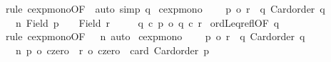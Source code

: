 \begin{isabellebody}
\ {\isacharparenleft}{\kern0pt}rule\ cexp{\isacharunderscore}{\kern0pt}mono{\isacharbrackleft}{\kern0pt}OF\ {}{\isacharbrackright}{\kern0pt}{\isacharparenright}{\kern0pt}\ {\isacharparenleft}{\kern0pt}auto\ simp{\isacharcolon}{\kern0pt}\ q{\isacharparenright}{\kern0pt}%
\endisatagproof
{\isafoldproof}%
%
\isadelimproof
\isanewline
%
\endisadelimproof
\isanewline
{}\isamarkupfalse%
\ cexp{\isacharunderscore}{\kern0pt}mono{}{\isacharprime}{\kern0pt}{\isacharcolon}{\kern0pt}\isanewline
\ \ \ {}{\isacharcolon}{\kern0pt}\ {\isachardoublequoteopen}p{}\ {\isasymle}o\ r{}{\isachardoublequoteclose}\ \ q{\isacharcolon}{\kern0pt}\ {\isachardoublequoteopen}Card{\isacharunderscore}{\kern0pt}order\ q{\isachardoublequoteclose}\isanewline
\ \ \ n{\isacharcolon}{\kern0pt}\ {\isachardoublequoteopen}Field\ p{}\ {\isacharequal}{\kern0pt}\ {\isacharbraceleft}{\kern0pt}{\isacharbraceright}{\kern0pt}\ {\isasymLongrightarrow}\ Field\ r{}\ {\isacharequal}{\kern0pt}\ {\isacharbraceleft}{\kern0pt}{\isacharbraceright}{\kern0pt}{\isachardoublequoteclose}\isanewline
\ \ \ {\isachardoublequoteopen}q\ {\isacharcircum}{\kern0pt}c\ p{}\ {\isasymle}o\ q\ {\isacharcircum}{\kern0pt}c\ r{}{\isachardoublequoteclose}\isanewline
%
\isadelimproof
%
\endisadelimproof
%
\isatagproof
{}\isamarkupfalse%
\ ordLeq{\isacharunderscore}{\kern0pt}refl{\isacharbrackleft}{\kern0pt}OF\ q{\isacharbrackright}{\kern0pt}\ \isamarkupfalse%
\ {\isacharparenleft}{\kern0pt}rule\ cexp{\isacharunderscore}{\kern0pt}mono{\isacharprime}{\kern0pt}{\isacharbrackleft}{\kern0pt}OF\ {\isacharunderscore}{\kern0pt}\ {}\ n{\isacharbrackright}{\kern0pt}{\isacharparenright}{\kern0pt}\ auto%
\endisatagproof
{\isafoldproof}%
%
\isadelimproof
\isanewline
%
\endisadelimproof
\isanewline
{}\isamarkupfalse%
\ cexp{\isacharunderscore}{\kern0pt}mono{}{\isacharcolon}{\kern0pt}\isanewline
\ \ \ {}{\isacharcolon}{\kern0pt}\ {\isachardoublequoteopen}p{}\ {\isasymle}o\ r{}{\isachardoublequoteclose}\ \ q{\isacharcolon}{\kern0pt}\ {\isachardoublequoteopen}Card{\isacharunderscore}{\kern0pt}order\ q{\isachardoublequoteclose}\isanewline
\ \ \ n{\isacharcolon}{\kern0pt}\ {\isachardoublequoteopen}p{}\ {\isacharequal}{\kern0pt}o\ czero\ {\isasymLongrightarrow}\ r{}\ {\isacharequal}{\kern0pt}o\ czero{\isachardoublequoteclose}\ \ card{\isacharcolon}{\kern0pt}\ {\isachardoublequoteopen}Card{\isacharunderscore}{\kern0pt}order\ p{}{\isachardoublequoteclose}\isanewline

\end{isabellebody}

